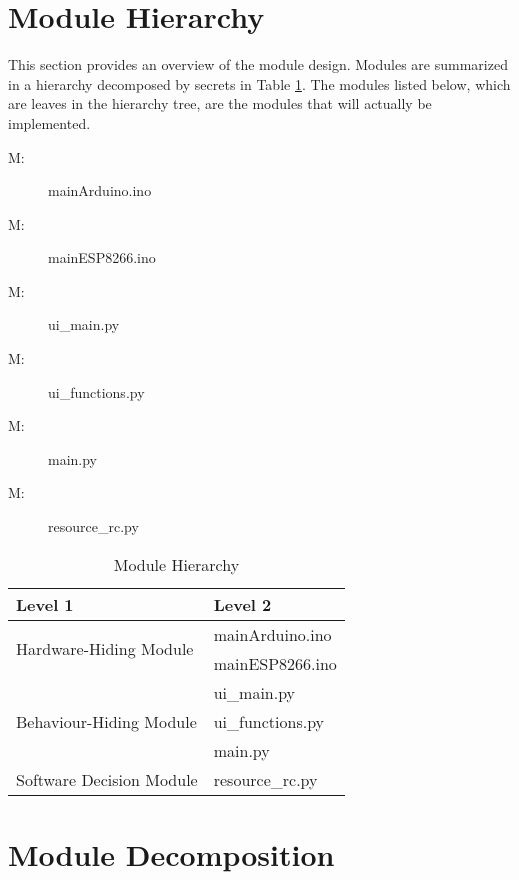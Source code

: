 \documentclass[12pt, titlepage]{article}
\newcounter{mnum}
\newcommand{\mthemnum}{M\themnum}
\begin{document}
\section{Module Hierarchy} \label{SecMH}

This section provides an overview of the module design. Modules are summarized
in a hierarchy decomposed by secrets in Table \ref{TblMH}. The modules listed
below, which are leaves in the hierarchy tree, are the modules that will
actually be implemented.

\begin{description}
\item [ \mthemnum \label{Arduino}:] mainArduino.ino
\item [ \mthemnum \label{ESP8266}:] mainESP8266.ino
\item [ \mthemnum \label{ui_main}:] ui\_main.py
\item [ \mthemnum \label{ui_functions}:] ui\_functions.py
\item [ \mthemnum \label{main}:] main.py
\item [ \mthemnum \label{resource_rc}:] resource\_rc.py

\end{description}


\begin{table}[h!]
\centering
\begin{tabular}{p{} p{}}
\toprule
\textbf{Level 1} & \textbf{Level 2}\\
\midrule

\multirow{2}{0.3\textwidth}{Hardware-Hiding Module} & mainArduino.ino \\
& mainESP8266.ino \\
\midrule

\multirow{3}{0.3\textwidth}{Behaviour-Hiding Module} & ui\_main.py\\
& ui\_functions.py\\
& main.py\\
\midrule

{Software Decision Module} & {resource\_rc.py}\\
\bottomrule

\end{tabular}
\caption{Module Hierarchy}
\label{TblMH}
\end{table}

\section{Module Decomposition} \label{SecMD}
\end{document}
